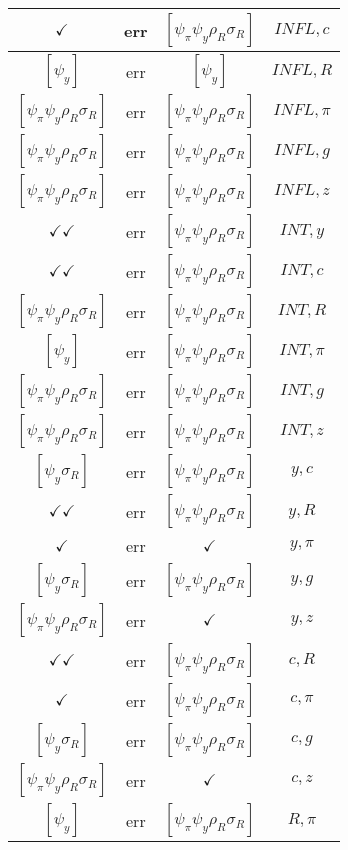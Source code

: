 \documentclass[a4paper,10pt]{article}
\begin{document}
\begin{longtable}{|c|c|c|c|}
\hline
$\checkmark$ & err & $[\psi_\pi \psi_y \rho_R \sigma_R ]$ & ${INFL},{c}$ \\
\hline
$[\psi_y ]$ & err & $[\psi_y ]$ & ${INFL},{R}$ \\
\hline
$[\psi_\pi \psi_y \rho_R \sigma_R ]$ & err & $[\psi_\pi \psi_y \rho_R \sigma_R ]$ & ${INFL},{\pi}$ \\
\hline
$[\psi_\pi \psi_y \rho_R \sigma_R ]$ & err & $[\psi_\pi \psi_y \rho_R \sigma_R ]$ & ${INFL},{g}$ \\
\hline
$[\psi_\pi \psi_y \rho_R \sigma_R ]$ & err & $[\psi_\pi \psi_y \rho_R \sigma_R ]$ & ${INFL},{z}$ \\
\hline
$\checkmark\checkmark$ & err & $[\psi_\pi \psi_y \rho_R \sigma_R ]$ & ${INT},{y}$ \\
\hline
$\checkmark\checkmark$ & err & $[\psi_\pi \psi_y \rho_R \sigma_R ]$ & ${INT},{c}$ \\
\hline
$[\psi_\pi \psi_y \rho_R \sigma_R ]$ & err & $[\psi_\pi \psi_y \rho_R \sigma_R ]$ & ${INT},{R}$ \\
\hline
$[\psi_y ]$ & err & $[\psi_\pi \psi_y \rho_R \sigma_R ]$ & ${INT},{\pi}$ \\
\hline
$[\psi_\pi \psi_y \rho_R \sigma_R ]$ & err & $[\psi_\pi \psi_y \rho_R \sigma_R ]$ & ${INT},{g}$ \\
\hline
$[\psi_\pi \psi_y \rho_R \sigma_R ]$ & err & $[\psi_\pi \psi_y \rho_R \sigma_R ]$ & ${INT},{z}$ \\
\hline
$[\psi_y \sigma_R ]$ & err & $[\psi_\pi \psi_y \rho_R \sigma_R ]$ & ${y},{c}$ \\
\hline
$\checkmark\checkmark$ & err & $[\psi_\pi \psi_y \rho_R \sigma_R ]$ & ${y},{R}$ \\
\hline
$\checkmark$ & err & $\checkmark$ & ${y},{\pi}$ \\
\hline
$[\psi_y \sigma_R ]$ & err & $[\psi_\pi \psi_y \rho_R \sigma_R ]$ & ${y},{g}$ \\
\hline
$[\psi_\pi \psi_y \rho_R \sigma_R ]$ & err & $\checkmark$ & ${y},{z}$ \\
\hline
$\checkmark\checkmark$ & err & $[\psi_\pi \psi_y \rho_R \sigma_R ]$ & ${c},{R}$ \\
\hline
$\checkmark$ & err & $[\psi_\pi \psi_y \rho_R \sigma_R ]$ & ${c},{\pi}$ \\
\hline
$[\psi_y \sigma_R ]$ & err & $[\psi_\pi \psi_y \rho_R \sigma_R ]$ & ${c},{g}$ \\
\hline
$[\psi_\pi \psi_y \rho_R \sigma_R ]$ & err & $\checkmark$ & ${c},{z}$ \\
\hline
$[\psi_y ]$ & err & $[\psi_\pi \psi_y \rho_R \sigma_R ]$ & ${R},{\pi}$ \\

\end{longtable}
\end{document}
